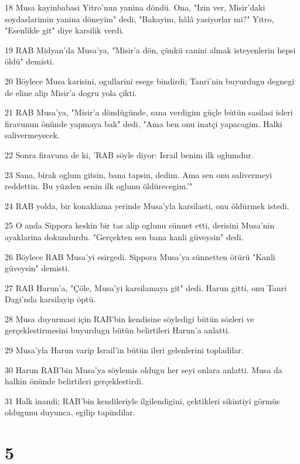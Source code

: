 \par 18 Musa kayinbabasi Yitro'nun yanina döndü. Ona, "Izin ver, Misir'daki soydaslarimin yanina döneyim" dedi, "Bakayim, hâlâ yasiyorlar mi?" Yitro, "Esenlikle git" diye karsilik verdi.
\par 19 RAB Midyan'da Musa'ya, "Misir'a dön, çünkü canini almak isteyenlerin hepsi öldü" demisti.
\par 20 Böylece Musa karisini, ogullarini esege bindirdi; Tanri'nin buyurdugu degnegi de eline alip Misir'a dogru yola çikti.
\par 21 RAB Musa'ya, "Misir'a döndügünde, sana verdigim güçle bütün sasilasi isleri firavunun önünde yapmaya bak" dedi, "Ama ben onu inatçi yapacagim. Halki salivermeyecek.
\par 22 Sonra firavuna de ki, 'RAB söyle diyor: Israil benim ilk oglumdur.
\par 23 Sana, birak oglum gitsin, bana tapsin, dedim. Ama sen onu salivermeyi reddettin. Bu yüzden senin ilk oglunu öldürecegim.'"
\par 24 RAB yolda, bir konaklama yerinde Musa'yla karsilasti, onu öldürmek istedi.
\par 25 O anda Sippora keskin bir tas alip oglunu sünnet etti, derisini Musa'nin ayaklarina dokundurdu. "Gerçekten sen bana kanli güveysin" dedi.
\par 26 Böylece RAB Musa'yi esirgedi. Sippora Musa'ya sünnetten ötürü "Kanli güveysin" demisti.
\par 27 RAB Harun'a, "Çöle, Musa'yi karsilamaya git" dedi. Harun gitti, onu Tanri Dagi'nda karsilayip öptü.
\par 28 Musa duyurmasi için RAB'bin kendisine söyledigi bütün sözleri ve gerçeklestirmesini buyurdugu bütün belirtileri Harun'a anlatti.
\par 29 Musa'yla Harun varip Israil'in bütün ileri gelenlerini topladilar.
\par 30 Harun RAB'bin Musa'ya söylemis oldugu her seyi onlara anlatti. Musa da halkin önünde belirtileri gerçeklestirdi.
\par 31 Halk inandi; RAB'bin kendileriyle ilgilendigini, çektikleri sikintiyi görmüs oldugunu duyunca, egilip tapindilar.

\chapter{5}

